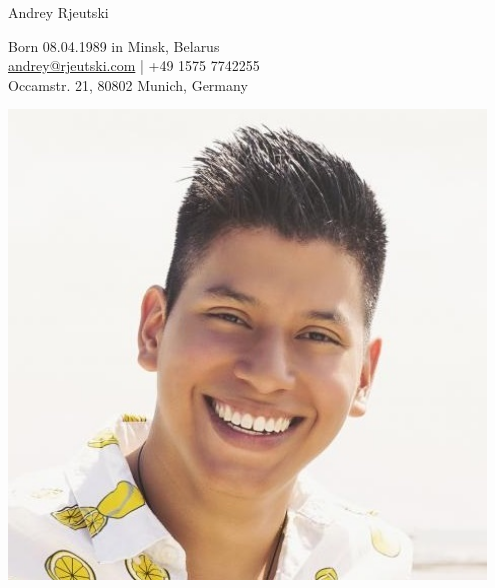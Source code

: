 \documentclass[a4paper,11pt]{article}
\makeatletter
\newcommand{\myemail}{andrey@rjeutski.com}
\newcommand{\minsk}{Minsk, Belarus}
\makeatother
\begin{document}
  \begin{minipage}{0.69\textwidth}
    \begin{centering}
      {\Huge Andrey Rjeutski}

      Born 08.04.1989 in \minsk\\
      \href{mailto:\myemail}{\myemail} | +49 1575 7742255\\
      Occamstr. 21, 80802 Munich, Germany
      
    \end{centering}
  \end{minipage}
  \begin{minipage}{0.3\textwidth}
    \includegraphics[width=0.95\textwidth]{photo}
  \end{minipage}
  
\end{document}
